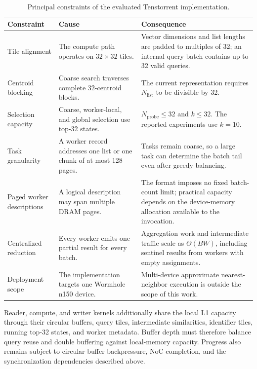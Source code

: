 \begin{table}[htbp]
\centering
\caption{Principal constraints of the evaluated Tenstorrent implementation.}
\label{tab:implementation-constraints}
\small
\setlength{\tabcolsep}{5pt}
\renewcommand{\arraystretch}{1.12}
\begin{tabularx}{\textwidth}{>{\raggedright\arraybackslash}p{} >{\raggedright\arraybackslash}p{} >{\raggedright\arraybackslash}X}
\toprule
Constraint & Cause & Consequence \\
\midrule
Tile alignment
& The compute path operates on \(32\times32\) tiles.
& Vector dimensions and list lengths are padded to multiples of 32; an
  internal query batch contains up to 32 valid queries. \\

Centroid blocking
& Coarse search traverses complete 32-centroid blocks.
& The current representation requires \(N_{\mathrm{list}}\) to be divisible
  by 32. \\

Selection capacity
& Coarse, worker-local, and global selection use top-32 states.
& \(N_{\mathrm{probe}}\leq32\) and \(k\leq32\). The reported experiments use
  \(k=10\). \\

Task granularity
& A worker record addresses one list or one chunk of at most 128 pages.
& Tasks remain coarse, so a large task can determine the batch tail even
  after greedy balancing. \\

Paged worker descriptions
& A logical description may span multiple DRAM pages.
& The format imposes no fixed batch-count limit; practical capacity depends
  on the device-memory allocation available to the invocation. \\

Centralized reduction
& Every worker emits one partial result for every batch.
& Aggregation work and intermediate traffic scale as \(\Theta(BW)\), including
  sentinel results from workers with empty assignments. \\

Deployment scope
& The implementation targets one Wormhole n150 device.
& Multi-device approximate nearest-neighbor execution is outside the scope
  of this work. \\
\bottomrule
\end{tabularx}
\end{table}

Reader, compute, and writer kernels additionally share the local L1 capacity through their circular buffers, query tiles, intermediate similarities, identifier tiles, running top-32 states, and worker metadata. Buffer depth must therefore balance query reuse and double buffering against local-memory capacity. Progress also remains subject to circular-buffer backpressure, NoC completion, and the synchronization dependencies described above.

